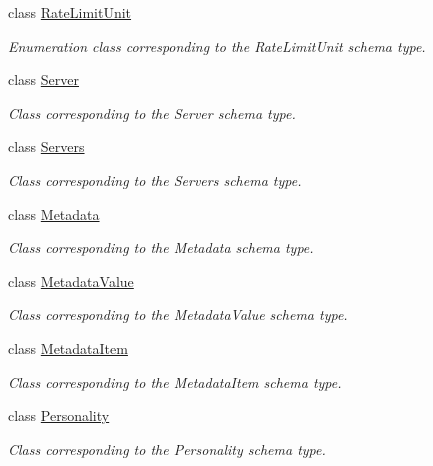 \begin{DoxyCompactItemize}
class \hyperlink{classopenstack_1_1xml_1_1RateLimitUnit}{RateLimitUnit}
\begin{DoxyCompactList}\small\item\em Enumeration class corresponding to the RateLimitUnit schema type. \item\end{DoxyCompactList}\item 
class \hyperlink{classopenstack_1_1xml_1_1Server}{Server}
\begin{DoxyCompactList}\small\item\em Class corresponding to the Server schema type. \item\end{DoxyCompactList}\item 
class \hyperlink{classopenstack_1_1xml_1_1Servers}{Servers}
\begin{DoxyCompactList}\small\item\em Class corresponding to the Servers schema type. \item\end{DoxyCompactList}\item 
class \hyperlink{classopenstack_1_1xml_1_1Metadata}{Metadata}
\begin{DoxyCompactList}\small\item\em Class corresponding to the Metadata schema type. \item\end{DoxyCompactList}\item 
class \hyperlink{classopenstack_1_1xml_1_1MetadataValue}{MetadataValue}
\begin{DoxyCompactList}\small\item\em Class corresponding to the MetadataValue schema type. \item\end{DoxyCompactList}\item 
class \hyperlink{classopenstack_1_1xml_1_1MetadataItem}{MetadataItem}
\begin{DoxyCompactList}\small\item\em Class corresponding to the MetadataItem schema type. \item\end{DoxyCompactList}\item 
class \hyperlink{classopenstack_1_1xml_1_1Personality}{Personality}
\begin{DoxyCompactList}\small\item\em Class corresponding to the Personality schema type. \item\end{DoxyCompactList}\item 

\end{DoxyCompactItemize}
